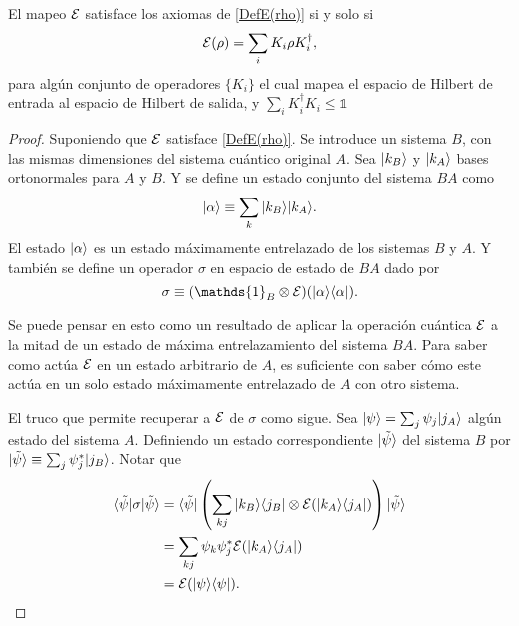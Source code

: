 \begin{theorem}
    El mapeo $\mathcal{E}$ satisface los axiomas de {\ref{DefE(rho)}} si y solo si 
    \begin{equation}
        \mathcal{E}(\rho)=\sum_i K_i \rho K_i^\dagger,
    \end{equation}
    para algún conjunto de operadores $\{K_i\}$ el cual mapea el espacio de Hilbert de entrada al espacio de Hilbert de salida, y $\sum_i K_i^\dagger K_i\le \mathds{1}$
\end{theorem}


\begin{proof}
Suponiendo que $\mathcal{E}$ satisface {\ref{DefE(rho)}}. Se introduce un sistema $B$, con las mismas dimensiones del sistema cuántico original $A$. Sea $|k_B\rangle$ y $|k_A\rangle$ bases ortonormales para $A$ y $B$. Y se define un estado conjunto del sistema $BA$ como \[|\alpha\rangle \equiv \sum_k |k_B\rangle |k_A\rangle.\] El estado $|\alpha\rangle $ es un estado máximamente entrelazado de los sistemas $B$ y $A$. Y también se define un operador $\sigma$ en espacio de estado de $BA$ dado por 
\begin{equation}\label{sigma1}
    \sigma \equiv (\mathds{1}_B\otimes\E)(|\alpha\rala \alpha|).
\end{equation}


Se puede pensar en esto como un resultado de aplicar la operación cuántica $\mathcal{E}$ a la mitad de un estado de máxima entrelazamiento del sistema $BA$. Para saber como actúa $\mathcal{E}$ en un estado arbitrario de $A$, es suficiente con saber cómo este actúa en un solo estado máximamente entrelazado de $A$ con otro sistema.

El truco que permite recuperar a $\mathcal{E}$ de $\sigma$ como sigue. Sea $|\psi\rangle=\sum_j \psi_j |j_A\rangle$ algún estado del sistema $A$. Definiendo un estado correspondiente $|\tilde{\psi}\rangle$ del sistema $B$ por $|\tilde{\psi}\rangle \equiv \sum_j \psi_j^*|j_B\rangle$. Notar que
\begin{equation}
    \begin{split}
        \langle \tilde \psi |\sigma |\tilde{\psi}\rangle&= \langle \tilde \psi |\left(\sum_{kj} |k_B\rangle \langle j_B|\otimes\mathcal{E} (|k_A \rangle \langle j_A|)\right) |\tilde{\psi}\rangle\\
        &=\sum_{kj} \psi_k \psi_j^* \mathcal{E} (|k_A \rangle \langle j_A|)\\
        &=\mathcal{E}(|\psi\rangle \langle\psi|).
    \end{split}
\end{equation}



\end{proof}
